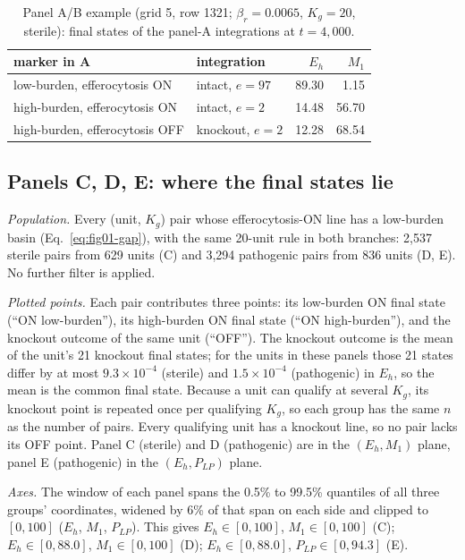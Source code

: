 \documentclass[11pt]{article}
\begin{document}
\begin{table}[H]
\centering
\caption{Panel A/B example (grid 5, row 1321; $\beta_r = 0.0065$, $K_g = 20$,
sterile): final states of the panel-A integrations at $t = 4{,}000$.}
\label{tab:fig01-example}
\begin{tabular}{llrr}
\toprule
marker in A & integration & $E_h$ & $M_1$ \\
\midrule
low-burden, efferocytosis ON  & intact, $e = 97$   & 89.30 & 1.15 \\
high-burden, efferocytosis ON & intact, $e = 2$    & 14.48 & 56.70 \\
high-burden, efferocytosis OFF & knockout, $e = 2$ & 12.28 & 68.54 \\
\bottomrule
\end{tabular}
\end{table}

\subsection{Panels C, D, E: where the final states lie}
\label{sec:fig1-CDE}

\emph{Population.} Every (unit, $K_g$) pair whose efferocytosis-ON line has a
low-burden basin (Eq.~\ref{eq:fig01-gap}), with the same 20-unit rule in both
branches: 2{,}537 sterile pairs from 629 units (C) and 3{,}294 pathogenic pairs from
836 units (D, E). No further filter is applied.

\emph{Plotted points.} Each pair contributes three points: its low-burden ON final
state (``ON low-burden''), its high-burden ON final state (``ON high-burden''), and the
knockout outcome of the same unit (``OFF''). The knockout outcome is the mean of the
unit's 21 knockout final states; for the units in these panels those 21 states
differ by at most $9.3\times10^{-4}$ (sterile) and $1.5\times10^{-4}$ (pathogenic) in
$E_h$, so the mean is the common final state. Because a unit can qualify at several
$K_g$, its knockout point is repeated once per qualifying $K_g$, so each group has the
same $n$ as the number of pairs. Every qualifying unit has a knockout line, so no
pair lacks its OFF point.
Panel C (sterile) and D (pathogenic) are in the $(E_h, M_1)$ plane, panel E
(pathogenic) in the $(E_h, P_{LP})$ plane.

\emph{Axes.} The window of each panel spans the 0.5\% to 99.5\% quantiles of all three
groups' coordinates, widened by 6\% of that span on each side and clipped to
$[0, 100]$ ($E_h$, $M_1$, $P_{LP}$). This gives $E_h \in [0, 100]$, $M_1 \in [0, 100]$ (C);
$E_h \in [0, 88.0]$, $M_1 \in [0, 100]$ (D); $E_h \in [0, 88.0]$, $P_{LP} \in [0, 94.3]$ (E).
\end{document}
